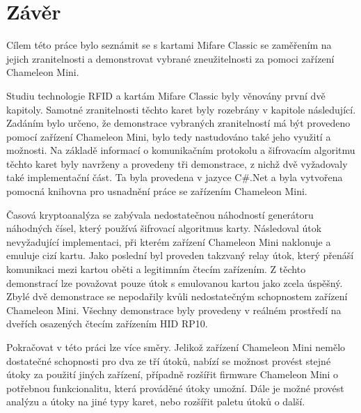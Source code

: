 \chapter{Závěr}
\label{zaver}
Cílem této práce bylo seznámit se s kartami Mifare Classic se zaměřením na jejich zranitelnosti a demonstrovat vybrané zneužitelnosti za pomoci zařízení Chameleon Mini. \par
Studiu technologie RFID a kartám Mifare Classic byly věnovány první dvě kapitoly. Samotné zranitelnosti těchto karet byly rozebrány v kapitole následující. Zadáním bylo určeno, že demonstrace vybraných zranitelností má být provedeno pomocí zařízení Chameleon Mini, bylo tedy nastudováno také jeho využití a možnosti.
Na základě informací o komunikačním protokolu a šifrovacím algoritmu těchto karet byly navrženy a provedeny tři demonstrace, z nichž dvě vyžadovaly také implementační část. Ta byla provedena v jazyce C\#.Net a byla vytvořena pomocná knihovna pro usnadnění práce se zařízením Chameleon Mini.\par
Časová kryptoanalýza se zabývala nedostatečnou náhodností generátoru náhodných čísel, který používá šifrovací algoritmus karty. Následoval útok nevyžadující implementaci, při kterém zařízení Chameleon Mini naklonuje a emuluje cizí kartu. Jako poslední byl proveden takzvaný relay útok, který přenáší komunikaci mezi kartou oběti a legitimním čtecím zařízením. Z těchto demonstrací lze považovat pouze útok s emulovanou kartou jako zcela úspěšný. Zbylé dvě demonstrace se nepodařily kvůli nedostatečným schopnostem zařízení Chameleon Mini. Všechny demonstrace byly provedeny v reálném prostředí na dveřích osazených čtecím zařízením HID RP10.\par

Pokračovat v této práci lze více směry. Jelikož zařízení Chameleon Mini nemělo dostatečné schopnosti pro dva ze tří útoků, nabízí se možnost provést stejné útoky za použití jiných zařízení, případně rozšířit firmware Chameleon Mini o potřebnou funkcionalitu, která prováděné útoky umožní. Dále je možné provést analýzu a útoky na jiné typy karet, nebo rozšířit paletu útoků o další.\par












